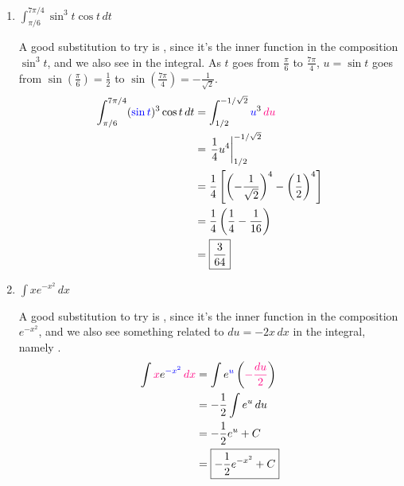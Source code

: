 \documentclass{article}
\begin{document}
\begin{enumerate}
\begin{enumerate}[topsep=0pt]
    \item
      \begin{problem}[\vfill]
        $\displaystyle \int_{\pi/6}^{7 \pi/4} \sin^3 t\cos t\,dt$
      \end{problem}

      \begin{solution}
        A good substitution to try is , since it's the
        inner function in the composition $\sin^3 t$, and we also see
         in the integral.  As $t$ goes from
        $\frac{\pi}{6}$ to $\frac{7 \pi}{4}$, $u = \sin t$ goes from $\sin
        \left( \frac{\pi}{6} \right) = \frac{1}{2}$ to $\sin \left(
          \frac{7 \pi}{4} \right) = - \frac{1}{\sqrt{2}}$.
        \begin{align*}
          \int_{\pi/6}^{7 \pi/4} (\sub{\sin t})^3 \cos t\,dt &=
          \int_{1/2}^{-1/\sqrt{2}} \sub{u}^3\, \subd{du} \\
          &= \left. \frac{1}{4} u^4 \right|_{1/2}^{-1/\sqrt{2}} \\
          &= \frac{1}{4} \left[ \left( - \frac{1}{\sqrt{2}} \right)^4 -
            \left( \frac{1}{2} \right)^4 \right] \\
          &= \frac{1}{4} \left( \frac{1}{4} - \frac{1}{16}
          \right) \\
          &= \boxed{\frac{3}{64}}
        \end{align*}
      \end{solution}

    \item 

      \begin{problem}[\stretch{0.7}]
       $\displaystyle \int x e^{-x^2}\,dx$
      \end{problem}

      \begin{solution}
        A good substitution to try is , since it's the inner
        function in the composition $e^{-x^2}$, and we also see something
        related to $du = -2x\,dx$ in the integral, namely
        .
        \begin{align*}
          \int \subd{x} e^{\sub{-x^2}}\,\subd{dx} &= \int e^{\sub{u}} \left(
            \subd{-\frac{du}{2}} \right) \\
          &= - \frac{1}{2} \int e^u\,du \\
          &= - \frac{1}{2} e^u + C \\
          &= \boxed{- \frac{1}{2} e^{-x^2} + C}
        \end{align*}
      \end{solution}


\end{enumerate}
\end{enumerate}
\end{document}
